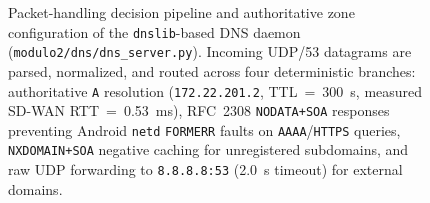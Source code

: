 \begin{figure}[htbp]
{%
}
\caption{Packet-handling decision pipeline and authoritative zone configuration of the \texttt{dnslib}-based DNS daemon (\texttt{modulo2/dns/}\allowbreak\texttt{dns\_server.py}). Incoming UDP/53 datagrams are parsed, normalized, and routed across four deterministic branches: authoritative \texttt{A} resolution (\texttt{172.22.201.2}, TTL~=~\qty{300}{\second}, measured SD-WAN RTT~=~\qty{0.53}{\milli\second}), RFC~2308 \texttt{NODATA+SOA} responses preventing Android \texttt{netd} \texttt{FORMERR} faults on \texttt{AAAA}/\texttt{HTTPS} queries, \texttt{NXDOMAIN+SOA} negative caching for unregistered subdomains, and raw UDP forwarding to \texttt{8.8.8.8:53} (\qty{2.0}{\second} timeout) for external domains.}
\label{fig:dns_flowchart}
\end{figure}
